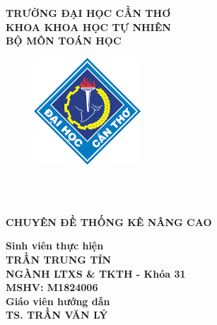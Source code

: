 \documentclass[a4paper,oneside]{../../styles/thesis}
\begin{document}
\fontsize{13pt}{22pt}\selectfont

\thispagestyle{empty}
\begin{titlepage}

\hspace{2.8cm} {\bf \fontsize{16pt}{16}\selectfont TRƯỜNG ĐẠI HỌC CẦN THƠ}\\
\vspace*{0.05cm}
\hspace{3.3cm} {\bf\fontsize{16pt}{16}\selectfont KHOA KHOA HỌC TỰ NHIÊN}\\
 \vspace*{0.05cm}
\hspace{4.3cm} {\bf\fontsize{16pt}{16}\selectfont BỘ MÔN TOÁN HỌC}\\

\begin{figure}[h!]
\hspace{5cm} \includegraphics[width=40mm]{../../assets/logos/university-logo.png}
\end{figure}

\vspace*{0.5cm}

\\
 \vspace*{0.05cm}\\
\vspace*{2cm}

\begin{center}
 {\bf\fontsize{20pt}{28}\selectfont CHUYÊN ĐỀ THỐNG KÊ NÂNG CAO}   
\end{center}




\vspace*{1.5cm}

\begin{center}
\textbf{Sinh viên thực hiện}\\    
\textbf{TRẦN TRUNG TÍN}\\
\textbf{NGÀNH LTXS \& TKTH - Khóa 31}\\
\textbf{MSHV: M1824006}\\
\vspace{1cm}
\textbf{Giáo viên hướng dẫn}\\
\textbf{TS. TRẦN VĂN LÝ}
\end{center}



\vspace*{3cm}
\end{titlepage}
\end{document}
